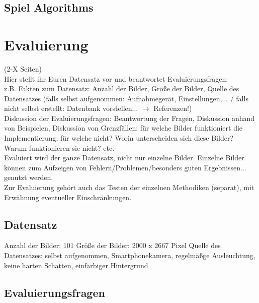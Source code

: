 \documentclass[paper=A4, deutsch]{scrartcl}
\begin{document}
\subsection{Spiel Algorithms}



\section{Evaluierung}
(2-X Seiten)\\
Hier stellt ihr Euren Datensatz vor und beantwortet Evaluierungsfragen:\\
z.B. Fakten zum Datensatz: Anzahl der Bilder, Größe der Bilder, Quelle des Datensatzes (falls selbst aufgenommen: Aufnahmegerät, Einstellungen,... / falls nicht selbst erstellt: Datenbank vorstellen... $\to$ Referenzen!)\\
Diskussion der Evaluierungsfragen: Beantwortung der Fragen, Diskussion anhand von Beispielen, Diskussion von Grenzfällen: für welche Bilder funktioniert die Implementierung, für welche nicht? Worin unterscheiden sich diese Bilder? Warum funktionieren sie nicht? etc.\\
Evaluiert wird der ganze Datensatz, nicht nur einzelne Bilder. Einzelne Bilder können zum Aufzeigen von Fehlern/Problemen/besonders guten Ergebnissen... genutzt werden.\\
Zur Evaluierung gehört auch das Testen der einzelnen Methodiken (separat), mit Erwähnung eventueller Einschränkungen.

\subsection{Datensatz}
Anzahl der Bilder: 101
Größe der Bilder: 2000 x 2667 Pixel
Quelle des Datensatzes: selbst aufgenommen, Smartphonekamera, regelmäßge Ausleuchtung, keine harten Schatten, einfärbiger Hintergrund

\subsection{Evaluierungsfragen}
\end{document}
